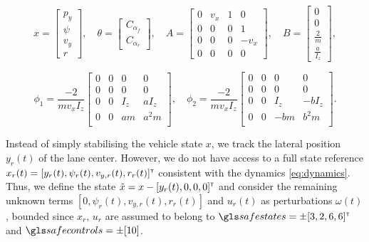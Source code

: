\[
x = \begin{bmatrix} {p_y} \\ {\psi} \\ {v_y} \\ {r} \end{bmatrix},\quad
\theta = \begin{bmatrix} C_{\alpha_f} \\ C_{\alpha_r}\end{bmatrix},\quad
A = \begin{bmatrix}
0 & v_x & 1 & 0 \\
0 & 0 & 0 & 1 \\
0 & 0 & 0 & - v_x \\
0 & 0 & 0 & 0
\end{bmatrix},\quad
B =
\begin{bmatrix}
0 \\
0 \\
\frac{2}{m} \\
\frac{a}{I_z}
\end{bmatrix},
\]

\[
\phi_1 = \frac{-2}{m v_x I_z}\begin{bmatrix}
0 & 0 & 0 & 0 \\
0 & 0 & 0 & 0 \\
0 & 0 & I_z & a I_z \\
0 & 0 & a m & a^2 m \\
\end{bmatrix},
\quad
\phi_2 = \frac{-2}{m v_x I_z}\begin{bmatrix}
0 & 0 & 0 & 0 \\
0 & 0 & 0 & 0 \\
0 & 0 & I_z & -b I_z \\
0 & 0 & - bm & b^2 m \\
\end{bmatrix}.
\]

\noindent Instead of simply stabilising the vehicle state $x$, we track the lateral position $y_r(t)$ of the lane center. However, we do not have access to a full state reference $x_r(t) = [y_r(t), \psi_r(t), v_{y,r}(t), r_r(t)]^{\mathsf{\scriptscriptstyle T}}$ consistent with the dynamics \eqref{eq:dynamics}. Thus, we define the state $\tilde{x} = x - [y_r(t), 0, 0, 0]^{\mathsf{\scriptscriptstyle T}}$ and consider the remaining unknown terms $[0, \psi_r(t), v_{y,r}(t), r_r(t)]$ and $u_r(t)$ as perturbations $\omega(t)$, bounded since $x_r,\,u_r$ are assumed to belong to $\safestates = \pm[3, 2, 6, 6]^\transp$ and $\safecontrols=\pm[10]$.

